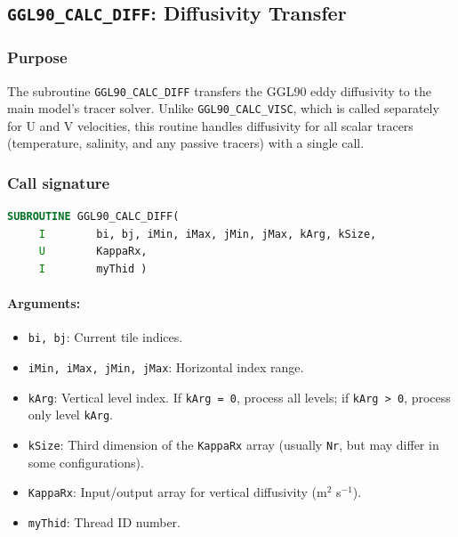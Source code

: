 \documentclass[12pt,letterpaper]{article}
\begin{document}
\subsection{\texttt{GGL90\_CALC\_DIFF}: Diffusivity Transfer}
\label{sec:diff_transfer}

\subsubsection{Purpose}

The subroutine \verb|GGL90_CALC_DIFF| transfers the GGL90 eddy diffusivity to the main model's tracer solver. Unlike \verb|GGL90_CALC_VISC|, which is called separately for U and V velocities, this routine handles diffusivity for all scalar tracers (temperature, salinity, and any passive tracers) with a single call.

\subsubsection{Call signature}

\begin{lstlisting}[language=Fortran,caption={(ggl90\_calc\_diff.F:L7--10) Subroutine interface}]
      SUBROUTINE GGL90_CALC_DIFF(
     I        bi, bj, iMin, iMax, jMin, jMax, kArg, kSize,
     U        KappaRx,
     I        myThid )
\end{lstlisting}

\paragraph{Arguments:}
\begin{itemize}
\item \verb|bi, bj|: Current tile indices.
\item \verb|iMin, iMax, jMin, jMax|: Horizontal index range.
\item \verb|kArg|: Vertical level index. If \verb|kArg = 0|, process all levels; if \verb|kArg > 0|, process only level \verb|kArg|.
\item \verb|kSize|: Third dimension of the \verb|KappaRx| array (usually \verb|Nr|, but may differ in some configurations).
\item \verb|KappaRx|: Input/output array for vertical diffusivity (m$^2$ s$^{-1}$).
\item \verb|myThid|: Thread ID number.
\end{itemize}
\end{document}
